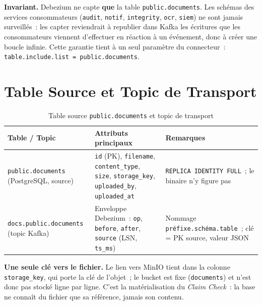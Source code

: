 \documentclass[12pt,a4paper,openany]{report}
\begin{document}
    \begin{critbox}
    \textbf{Invariant.} Debezium ne capte \textbf{que} la table \texttt{public.documents}. Les sch\'emas des services consommateurs (\texttt{audit}, \texttt{notif}, \texttt{integrity}, \texttt{ocr}, \texttt{siem}) ne sont jamais surveill\'es~: les capter reviendrait \`a republier dans Kafka les \'ecritures que les consommateurs viennent d'effectuer en r\'eaction \`a un \'ev\'enement, donc \`a cr\'eer une boucle infinie. Cette garantie tient \`a un seul param\`etre du connecteur~: \texttt{table.include.list = public.documents}.
    \end{critbox}

    \section{Table Source et Topic de Transport}

    \begin{table}[H]
    \centering
    \small
    \begin{tabularx}{\textwidth}{p{3.6cm}Xp{3.6cm}}
    \toprule
    \textbf{Table / Topic} & \textbf{Attributs principaux} & \textbf{Remarques} \\
    \midrule
    \texttt{public.documents} (PostgreSQL, source) & \texttt{id} (PK), \texttt{filename}, \texttt{content\_type}, \texttt{size}, \texttt{storage\_key}, \texttt{uploaded\_by}, \texttt{uploaded\_at} & \texttt{REPLICA IDENTITY FULL}~; le binaire n'y figure pas \\[4pt]
    \texttt{docs.public.documents} (topic Kafka) & Enveloppe Debezium~: \texttt{op}, \texttt{before}, \texttt{after}, \texttt{source} (LSN, \texttt{ts\_ms}) & Nommage \texttt{pr\'efixe.sch\'ema.table}~; cl\'e = PK source, valeur JSON \\
    \bottomrule
    \end{tabularx}
    \caption{Table source \texttt{public.documents} et topic de transport}
    \end{table}

    \begin{notebox}
    \textbf{Une seule cl\'e vers le fichier.} Le lien vers MinIO tient dans la colonne \texttt{storage\_key}, qui porte la cl\'e de l'objet~; le bucket est fixe (\texttt{documents}) et n'est donc pas stock\'e ligne par ligne. C'est la mat\'erialisation du \emph{Claim Check}~: la base ne conna\^it du fichier que sa r\'ef\'erence, jamais son contenu.
    \end{notebox}
\end{document}
